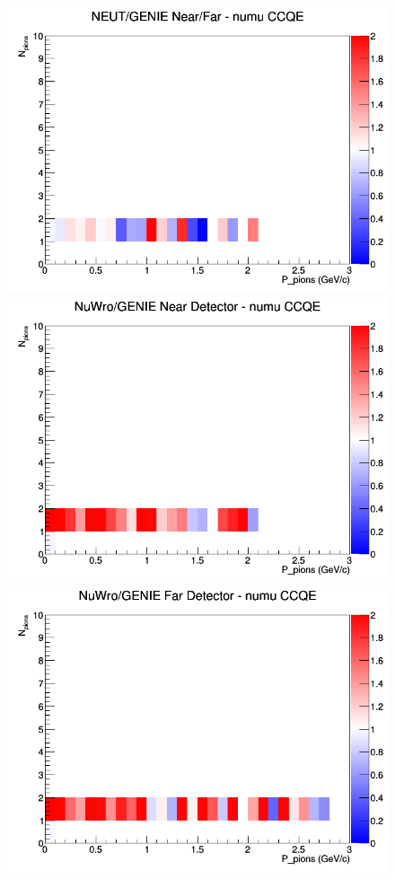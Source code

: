 \documentclass[12pt]{article}
\begin{document}
\begin{figure}[h]
\endminipage
{}
\includegraphics[width=\linewidth]{N_P/nominal/pions/ratios/CCQE_NEUT_GENIE_numu_NF_N_P.png}
\endminipage
\newline
{}
\includegraphics[width=\linewidth]{N_P/nominal/pions/ratios/CCQE_NuWro_GENIE_numu_near_N_P.png}
\endminipage
{}
\includegraphics[width=\linewidth]{N_P/nominal/pions/ratios/CCQE_NuWro_GENIE_numu_far_N_P.png}

\end{figure}
\end{document}

